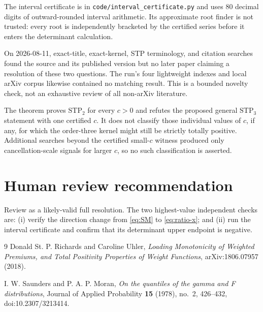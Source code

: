 \documentclass[11pt]{article}
\newcommand{\STP}{\mathrm{STP}}
\begin{document}
The interval certificate is in \texttt{code/interval\_certificate.py} and uses
80 decimal digits of outward-rounded interval arithmetic.  Its approximate
root finder is not trusted: every root is independently bracketed by the
certified series before it enters the determinant calculation.

On 2026-08-11, exact-title, exact-kernel, STP terminology, and citation searches
found the source and its published version but no later paper claiming a
resolution of these two questions.  The run's four lightweight indexes and
local arXiv corpus likewise contained no matching result.  This is a bounded
novelty check, not an exhaustive review of all non-arXiv literature.

The theorem proves \(\STP_2\) for every \(c>0\) and refutes the proposed general
\(\STP_3\) statement with one certified \(c\).  It does not classify those
individual values of \(c\), if any, for which the order-three kernel might
still be strictly totally positive.  Additional searches beyond the certified
small-\(c\) witness produced only cancellation-scale signals for larger \(c\),
so no such classification is asserted.

\section*{Human review recommendation}

Review as a likely-valid full resolution.  The two highest-value independent
checks are: (i) verify the direction change from \eqref{eq:SM} to
\eqref{eq:ratio-x}; and (ii) run the interval certificate and confirm that its
determinant upper endpoint is negative.

\begin{thebibliography}{9}
Donald St. P. Richards and Caroline Uhler,
\emph{Loading Monotonicity of Weighted Premiums, and Total Positivity
Properties of Weight Functions}, arXiv:1806.07957 (2018).

I. W. Saunders and P. A. P. Moran,
\emph{On the quantiles of the gamma and F distributions},
Journal of Applied Probability \textbf{15} (1978), no.~2, 426--432,
doi:10.2307/3213414.
\end{thebibliography}
\end{document}
